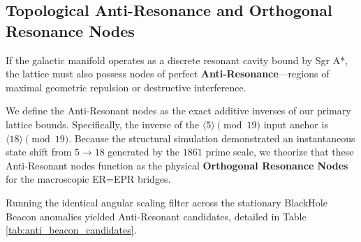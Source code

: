 \subsection{Topological Anti-Resonance and Orthogonal Resonance Nodes}

If the galactic manifold operates as a discrete resonant cavity bound by Sgr A*, the lattice must also possess nodes of perfect \textbf{Anti-Resonance}---regions of maximal geometric repulsion or destructive interference. 

We define the Anti-Resonant nodes as the exact additive inverses of our primary lattice bounds. Specifically, the inverse of the $\langle 5 \rangle \pmod{19}$ input anchor is $\langle 18 \rangle \pmod{19}$. Because the structural simulation demonstrated an instantaneous state shift from $5 \to 18$ generated by the $1861$ prime scale, we theorize that these Anti-Resonant nodes function as the physical \textbf{Orthogonal Resonance Nodes} for the macroscopic ER=EPR bridges.

Running the identical angular scaling filter across the stationary BlackHole Beacon anomalies yielded Anti-Resonant candidates, detailed in Table \ref{tab:anti_beacon_candidates}. 

\begin{table}[ht]
\centering
\renewcommand{\arraystretch}{1.2}
\caption{Top Anti-Resonant anomalies filtered via arithmetic scheme geometric inverses. These $PM=0.0$ candidates lock precisely into the $18 \pmod{19}$ invariant loop. \textbf{J1828-0611} acts as the flawless anti-root, theoretically serving as the Orthogonal Resonance Node for macroscopic topological entanglement.}
\label{tab:anti_beacon_candidates}
\end{table}

